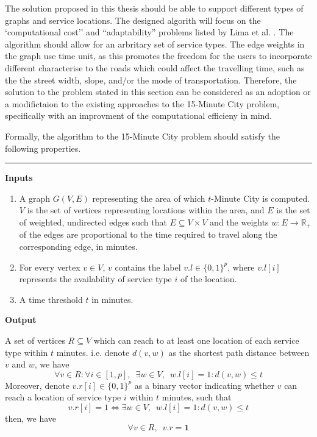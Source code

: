 The solution proposed in this thesis should be able to support different types of graphs and service locations. The designed algorith will focus on the `computational cost'' and ``adaptability'' problems listed by Lima et al. \cite{lima_quest_2023}. The algorithm should allow for an arbritary set of service types. The edge weights in the graph use time unit, as this promotes the freedom for the users to incorporate different characterise to the roads which could affect the travelling time, such as the the street width, slope, and/or the mode of transportation. Therefore, the solution to the problem stated in this section can be considered as an adoption or a modifictaion to the existing approaches to the 15-Minute City problem, specifically with an improvment of the computational efficieny in mind.

Formally, the algorithm to the 15-Minute City problem should satisfy the following properties.


\rule{\textwidth}{0.4pt}

\textbf{Inputs}
\begin{enumerate}
    \item A graph $G(V,E)$ representing the area of which $t$-Minute City is computed. $V$ is the set of vertices representing locations within the area, and $E$ is the set of weighted, undirected edges such that $E\subseteq V\times V$ and the weights $w:E\rightarrow\mathbb{R}_{+}$ of the edges are proportional to the time required to travel along the corresponding edge, in minutes.
    \item For every vertex $v\in V$, $v$ contains the label $v.l\in\{0,1\}^p$, where $v.l[i]$ represents the availability of service type $i$ of the location.
    \item A time threshold $t$ in minutes.
\end{enumerate}

\textbf{Output}

A set of vertices $R\subseteq V$ which can reach to at least one location of each service type within $t$ minutes. i.e. denote $d(v,w)$ as the shortest path distance between $v$ and $w$, we have $$\forall v\in R:\forall i\in[1,p],\enspace\exists w\in V,\enspace w.l[i]=1:d(v,w)\leq t$$ Moreover, denote $v.r[i]\in\{0,1\}^p$ as a binary vector indicating whether $v$ can reach a location of service type $i$ within $t$ minutes, such that $$v.r[i]=1\iff\exists w\in V,\enspace w.l[i]=1:d(v,w)\leq t$$ then, we have $$\forall v\in R,\enspace v.r = \mathbf{1}$$

